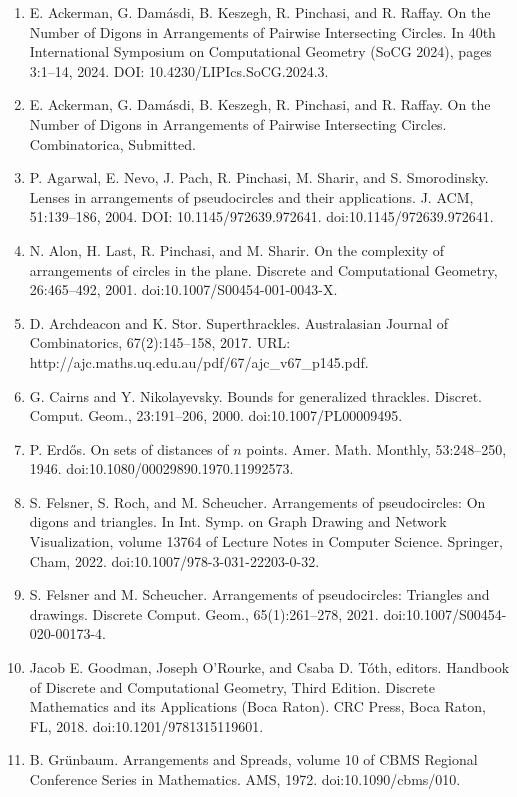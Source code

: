 \begin{enumerate}
\item[]  [1]  E. Ackerman, G. Damásdi, B. Keszegh, R. Pinchasi, and R. Raffay.  On the Number of Digons in Arrangements of Pairwise Intersecting Circles.  In 40th International Symposium on Computational Geometry (SoCG 2024), pages 3:1–14, 2024.  DOI: 10.4230/LIPIcs.SoCG.2024.3.  
\item[]  [2]  E. Ackerman, G. Damásdi, B. Keszegh, R. Pinchasi, and R. Raffay.  On the Number of Digons in Arrangements of Pairwise Intersecting Circles.  Combinatorica, Submitted.  
\item[]  [3]  P. Agarwal, E. Nevo, J. Pach, R. Pinchasi, M. Sharir, and S. Smorodinsky.  Lenses in arrangements of pseudocircles and their applications.  J. ACM, 51:139–186, 2004.  DOI: 10.1145/972639.972641.  doi:10.1145/972639.972641.  
\item[]  [4]  N. Alon, H. Last, R. Pinchasi, and M. Sharir.  On the complexity of arrangements of circles in the plane.  Discrete and Computational Geometry, 26:465–492, 2001.  doi:10.1007/S00454-001-0043-X.  
\item[]  [5]  D. Archdeacon and K. Stor.  Superthrackles.  Australasian Journal of Combinatorics, 67(2):145–158, 2017.  URL: http://ajc.maths.uq.edu.au/pdf/67/ajc\_v67\_p145.pdf.  
\item[]  [6]  G. Cairns and Y. Nikolayevsky.  Bounds for generalized thrackles.  Discret. Comput. Geom., 23:191–206, 2000.  doi:10.1007/PL00009495.  
\item[]  [7]  P. Erdős.  On sets of distances of $n$ points.  Amer. Math. Monthly, 53:248–250, 1946.  doi:10.1080/00029890.1970.11992573.  
\item[]  [8]  S. Felsner, S. Roch, and M. Scheucher.  Arrangements of pseudocircles: On digons and triangles.  In Int. Symp. on Graph Drawing and Network Visualization, volume 13764 of Lecture Notes in Computer Science. Springer, Cham, 2022.  doi:10.1007/978-3-031-22203-0-32.  
\item[]  [9]  S. Felsner and M. Scheucher.  Arrangements of pseudocircles: Triangles and drawings.  Discrete Comput. Geom., 65(1):261–278, 2021.  doi:10.1007/S00454-020-00173-4.  
\item[]  [10]  Jacob E. Goodman, Joseph O’Rourke, and Csaba D. Tóth, editors.  Handbook of Discrete and Computational Geometry, Third Edition.  Discrete Mathematics and its Applications (Boca Raton). CRC Press, Boca Raton, FL, 2018.  doi:10.1201/9781315119601.  
\item[]  [11]  B. Grünbaum.  Arrangements and Spreads, volume 10 of CBMS Regional Conference Series in Mathematics.  AMS, 1972.  doi:10.1090/cbms/010.  

\end{enumerate}
